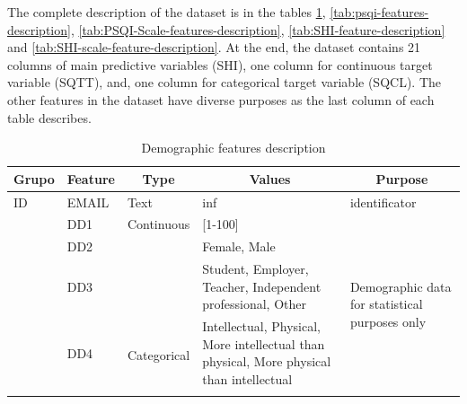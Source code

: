\documentclass[]{book}
\begin{document}
The complete description of the dataset is in the tables
\ref{tab:demographic-feature-description},
\ref{tab:psqi-features-description},
\ref{tab:PSQI-Scale-features-description},
\ref{tab:SHI-feature-description} and
\ref{tab:SHI-scale-feature-description}. At the end, the dataset
contains 21 columns of main predictive variables (SHI), one column for
continuous target variable (SQTT), and, one column for categorical
target variable (SQCL). The other features in the dataset have diverse
purposes as the last column of each table describes.

\begin{table}[ht]
    \centering
    \caption{Demographic features description}
    \label{tab:demographic-feature-description}
    \begin{tabular}{|l|l|l|p{5cm}|p{4cm}|}
        \hline
        \multicolumn{1}{|c|}{\textbf{Grupo}} & \multicolumn{1}{c|}{\textbf{Feature}} & \multicolumn{1}{c|}{\textbf{Type}} & \multicolumn{1}{c|}{\textbf{Values}}                                                     & \multicolumn{1}{c|}{\textbf{Purpose}}                              \\ \hline
        ID                                   & EMAIL                                 & Text                               & inf                                                                                      & identificator                                                   \\ \hline
        \multirow{8}{*}{}         & DD1                                   & Continuous                         & {[}1-100{]}                                                                              & \multirow{6}{4cm}{Demographic data for statistical purposes only} \\ \cline{2-4}
        & DD2                                   &        & Female, Male                                                                             &                                                                 \\ \cline{2-2} \cline{4-4} 
        & DD3                                   &                                    & Student, Employer, Teacher, Independent professional, Other                              &                                                                 \\ \cline{2-2} \cline{4-4}
        & DD4                                   & \multirow{6}{*}{Categorical}                                  & Intellectual, Physical, More intellectual than physical, More physical than intellectual &                                                                 \\ \cline{2-2} \cline{4-4} {Demographic}

\end{tabular}
\end{table}
\end{document}
